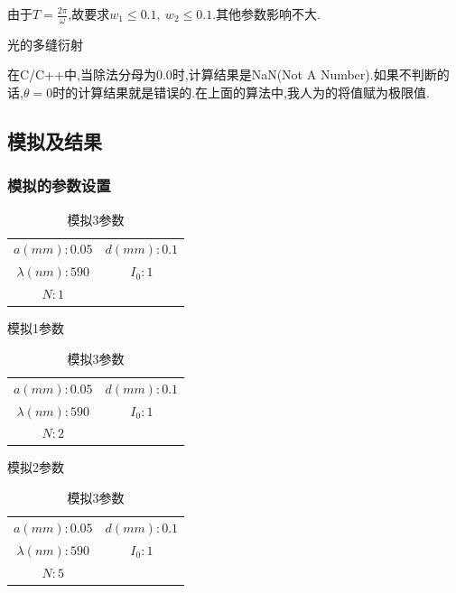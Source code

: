 \documentclass[10pt,a4paper]{article}
\begin{document}
由于$T = \frac{2\pi}{\omega}$,故要求$w_1 \leqslant 0.1,\ w_2 \leqslant 0.1$.其他参数影响不大.

\begin{algorithm}[H]
 \caption{光的多缝衍射}
\end{algorithm}
在C/C++中,当除法分母为0.0时,计算结果是NaN(Not A Number).如果不判断的话,$\theta=0$时的计算结果就是错误的.在上面的算法中,我人为的将值赋为极限值.

\subsection{模拟及结果}
\subsubsection{模拟的参数设置}
\begin{table}[H]
\begin{minipage}[b]{0.3\linewidth}\centering
\begin{tabular}{cc}
\hline
$a(mm): 0.05$ &$d(mm): 0.1$\\
$\lambda(nm): 590$ &$I_0: 1$\\
$N: 1$ &\\
\hline
\end{tabular}
\caption{模拟1参数}\label{tab:5}
\end{minipage}
\hspace{0.5cm}
\begin{minipage}[b]{0.3\linewidth}\centering
\begin{tabular}{cc}
\hline
$a(mm): 0.05$ &$d(mm): 0.1$\\
$\lambda(nm): 590$ &$I_0: 1$\\
$N: 2$ &\\
\hline
\end{tabular}
\caption{模拟2参数}\label{tab:6}
\end{minipage}
\hspace{0.5cm}
\begin{minipage}[b]{0.3\linewidth}\centering
\begin{tabular}{cc}
\hline
$a(mm): 0.05$ &$d(mm): 0.1$\\
$\lambda(nm): 590$ &$I_0: 1$\\
$N: 5$ &\\
\hline
\end{tabular}
\caption{模拟3参数}\label{tab:7}
\end{minipage}
\end{table}
\end{document}
